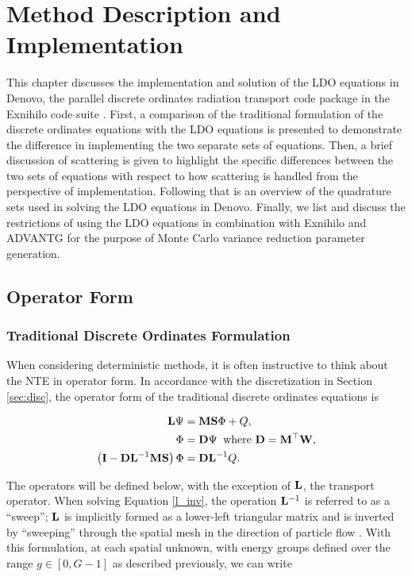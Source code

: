 \chapter{Method Description and Implementation}
\label{ch:method}

This chapter discusses the implementation and solution of the LDO equations in Denovo,
the parallel discrete ordinates radiation transport code package in the Exnihilo code 
suite \cite{exum}. First, a comparison of the traditional formulation of the discrete 
ordinates equations with the LDO equations is presented to demonstrate the difference 
in implementing the two separate sets of equations. Then, a brief discussion of 
scattering is given to highlight the specific differences between the two sets of 
equations with respect to how scattering is handled from the perspective of 
implementation. Following that is an overview of the quadrature sets used in solving 
the LDO equations in Denovo. Finally, we list
and discuss the restrictions of using the LDO equations in combination with Exnihilo 
and ADVANTG for the purpose of Monte Carlo variance reduction parameter generation.

\section{Operator Form}
\subsection{Traditional Discrete Ordinates Formulation}

When considering deterministic methods, it is often instructive to think about the NTE 
in operator form. In accordance with the discretization in Section \ref{sec:disc}, the 
operator form of the traditional discrete ordinates equations \cite{exmm} is

\begin{align}
\mathbf{L}\Psi &= \mathbf{MS}\Phi + Q, \\
\Phi &= \mathbf{D}\Psi\: \text{ where } \mathbf{D} = \mathbf{M}^\top\mathbf{W}, \\
\left(\mathbf{I} - \mathbf{DL}^{-1}\mathbf{MS}\right)\Phi &= \mathbf{DL}^{-1}Q.
\label{l_inv}
\end{align}

\noindent The operators will be defined below, with the exception of $\mathbf{L}$, the
transport operator. When solving Equation \ref{l_inv}, the operation $\mathbf{L}^{-1}$ is
referred to as a ``sweep''; $\mathbf{L}$ is implicitly formed as a lower-left triangular
matrix and is inverted by ``sweeping'' through the spatial mesh in the direction of
particle flow \cite{exmm}.
With this formulation, at each spatial unknown, with energy groups defined over the 
range $g\in[0,G-1]$ as described previously, we can write

